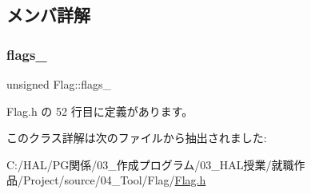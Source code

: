 \subsection{メンバ詳解}
\mbox{\label{class_flag_abd957aebe38d770132485740992bc41e}} 
\subsubsection{\texorpdfstring{flags\+\_\+}{flags\_}}
{\footnotesize\ttfamily unsigned Flag\+::flags\+\_\+\hspace{0.3cm}{\ttfamily [private]}}



 Flag.\+h の 52 行目に定義があります。



このクラス詳解は次のファイルから抽出されました\+:\begin{DoxyCompactItemize}
\item 
C\+:/\+H\+A\+L/\+P\+G関係/03\+\_\+作成プログラム/03\+\_\+\+H\+A\+L授業/就職作品/\+Project/source/04\+\_\+\+Tool/\+Flag/\mbox{\hyperlink{_flag_8h}{Flag.\+h}}\end{DoxyCompactItemize}
